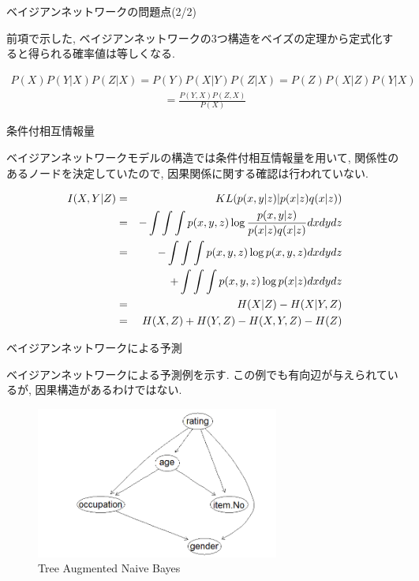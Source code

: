 \documentclass[dvipdfmx]{beamer}
\begin{document}
\begin{frame}{ベイジアンネットワークの問題点(2/2)}

前項で示した, ベイジアンネットワークの3つ構造をベイズの定理から定式化すると得られる確率値は等しくなる. 

\begin{eqnarray}
P(X) P(Y|X) P(Z|X) = P(Y) P(X|Y) P(Z|X) = P(Z) P(X|Z) P(Y|X) \nonumber 
\end{eqnarray} 
\vspace{-1.5zh}
\begin{eqnarray}
= \frac{P(Y, X) P(Z, X)}{P(X)} \nonumber
\end{eqnarray} 


\end{frame}

\begin{frame}{条件付相互情報量}

ベイジアンネットワークモデルの構造では条件付相互情報量を用いて, 関係性のあるノードを決定していたので, 因果関係に関する確認は行われていない. 

\begin{eqnarray}
\label{CMI}
I(X, Y | Z)  &=&  KL(p(x, y| z) | p(x|z) q(x|z)) \nonumber \\
               &=& - \int \int \int p(x, y, z) \log \frac{p(x, y|z)}{p(x|z) q(x|z)} dx dy dz \nonumber \\
               &=& - \int \int \int p(x, y, z) \log p(x, y, z) dx dy dz  \nonumber \\
               & & \hspace{0.5cm} + \int \int \int p(x, y, z) \log p(x| z) dx dy dz  \nonumber \\
               &=& H(X| Z) - H(X| Y, Z) \nonumber \\
               &=& H(X, Z) + H(Y, Z) - H(X, Y, Z) - H(Z) \nonumber
\end{eqnarray}
\end{frame}

\begin{frame}{ベイジアンネットワークによる予測}

ベイジアンネットワークによる予測例を示す. この例でも有向辺が与えられているが, 因果構造があるわけではない. 

\begin{figure}[H]
\begin{center}
\includegraphics[width=80mm]{data/sample2.png}
\caption{Tree Augmented Naive Bayes}
\label{TAN}
\end{center}
\end{figure}

\end{frame}
\end{document}
